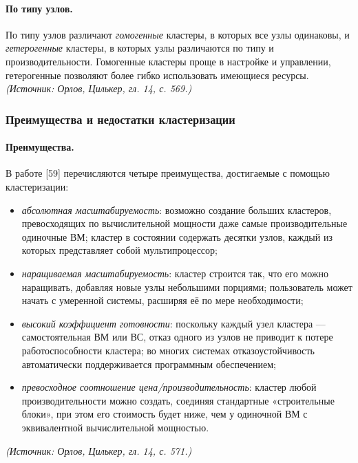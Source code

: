 \documentclass[a4paper,12pt]{article}
\begin{document}
\paragraph{По типу узлов.}
По типу узлов различают \emph{гомогенные} кластеры, в которых все узлы одинаковы, и \emph{гетерогенные} кластеры, в которых узлы различаются по типу и производительности. Гомогенные кластеры проще в настройке и управлении, гетерогенные позволяют более гибко использовать имеющиеся ресурсы.
\textit{(Источник: Орлов, Цилькер, гл. 14, с. 569.)}

\subsubsection{Преимущества и недостатки кластеризации}

\paragraph{Преимущества.}
В работе [59] перечисляются четыре преимущества, достигаемые с помощью кластеризации:
\begin{itemize}
\item \emph{абсолютная масштабируемость}: возможно создание больших кластеров, превосходящих по вычислительной мощности даже самые производительные одиночные ВМ; кластер в состоянии содержать десятки узлов, каждый из которых представляет собой мультипроцессор;
\item \emph{наращиваемая масштабируемость}: кластер строится так, что его можно наращивать, добавляя новые узлы небольшими порциями; пользователь может начать с умеренной системы, расширяя её по мере необходимости;
\item \emph{высокий коэффициент готовности}: поскольку каждый узел кластера — самостоятельная ВМ или ВС, отказ одного из узлов не приводит к потере работоспособности кластера; во многих системах отказоустойчивость автоматически поддерживается программным обеспечением;
\item \emph{превосходное соотношение цена/производительность}: кластер любой производительности можно создать, соединяя стандартные «строительные блоки», при этом его стоимость будет ниже, чем у одиночной ВМ с эквивалентной вычислительной мощностью.
\end{itemize}
\textit{(Источник: Орлов, Цилькер, гл. 14, с. 571.)}
\end{document}
